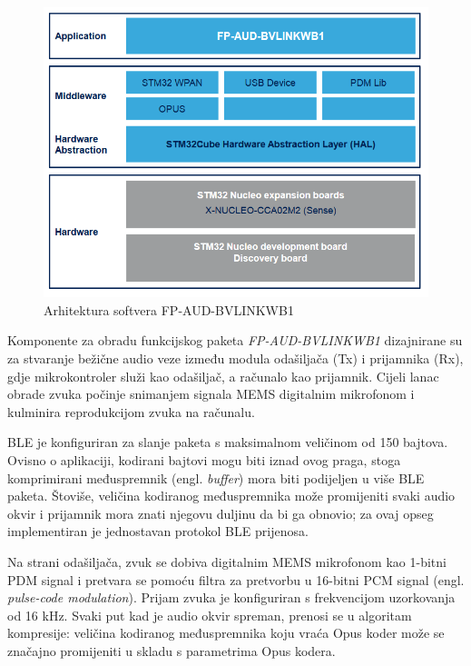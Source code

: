 \begin{figure}[ht]
	\includegraphics[width=\linewidth]{imgs/firmware_software_arch}
	\caption{Arhitektura softvera FP-AUD-BVLINKWB1 \cite{fpaudbvlink}}
	\label{fig:firmware_software_arch}
\end{figure}

Komponente za obradu funkcijskog paketa \textit{FP-AUD-BVLINKWB1} dizajnirane su za stvaranje bežične audio veze između modula odašiljača (Tx) i prijamnika (Rx), gdje mikrokontroler služi kao odašiljač, a računalo kao prijamnik. Cijeli lanac obrade zvuka počinje snimanjem signala MEMS digitalnim mikrofonom i kulminira reprodukcijom zvuka na računalu.

BLE je konfiguriran za slanje paketa s maksimalnom veličinom od 150 bajtova. Ovisno o aplikaciji, kodirani bajtovi mogu biti iznad ovog praga, stoga komprimirani međuspremnik (engl. \textit{buffer}) mora biti podijeljen u više BLE paketa. Štoviše, veličina kodiranog međuspremnika može promijeniti svaki audio okvir i prijamnik mora znati njegovu duljinu da bi ga obnovio; za ovaj opseg implementiran je jednostavan protokol BLE prijenosa.

Na strani odašiljača, zvuk se dobiva digitalnim MEMS mikrofonom kao 1-bitni PDM signal i pretvara se pomoću filtra za pretvorbu u 16-bitni PCM signal (engl. \textit{pulse-code modulation}). Prijam zvuka je konfiguriran s frekvencijom uzorkovanja od 16 kHz. Svaki put kad je audio okvir spreman, prenosi se u algoritam kompresije: veličina kodiranog međuspremnika koju vraća Opus koder može se značajno promijeniti u skladu s parametrima Opus kodera.

